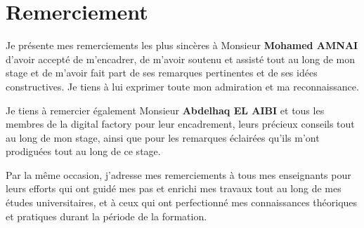 \chapter*{Remerciement}

{\large Je pr\'esente mes remerciements les plus sinc\`eres \`a Monsieur \textbf{Mohamed AMNAI} d'avoir accept\'e de m'encadrer, de m'avoir soutenu et assist\'e tout au long de mon stage et de m'avoir fait part de ses remarques pertinentes et de ses id\'ees constructives. Je tiens \`a lui exprimer toute mon admiration et ma reconnaissance.

\vspace{1.5\baselineskip}

Je tiens \`a remercier \'egalement Monsieur \textbf{Abdelhaq EL AIBI} et tous les membres de la digital factory pour leur encadrement, leurs pr\'ecieux conseils tout au long de mon stage, ainsi que pour les remarques \'eclair\'ees qu'ils m'ont prodigu\'ees tout au long de ce stage.

\vspace{1.5\baselineskip}

Par la m\^eme occasion, j'adresse mes remerciements \`a tous mes enseignants pour leurs efforts qui ont guid\'e mes pas et enrichi mes travaux tout au long de mes \'etudes universitaires, et \`a ceux qui ont perfectionn\'e mes connaissances th\'eoriques et pratiques durant la p\'eriode de la formation.

\vspace{1.5\baselineskip}

}

